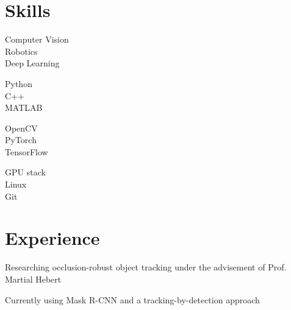\documentclass[]{deedy-resume-openfont}
\begin{document}
\begin{minipage}[t]{.6\textwidth}
\section{Skills}
\begin{minipage}[t]{.3\textwidth}
 \textbullet{}Computer Vision\\
 \textbullet{}Robotics\\
 \textbullet{}Deep Learning\\
 \hfill
\end{minipage}
\begin{minipage}[t]{.22\textwidth}
 \textbullet{}Python\\
 \textbullet{}C++\\
 \textbullet{}MATLAB\\
\end{minipage}
\begin{minipage}[t]{.22\textwidth}
\textbullet{}OpenCV\\
\textbullet{}PyTorch\\
\textbullet{}TensorFlow\\
\end{minipage}
\begin{minipage}[t]{.22\textwidth}
\textbullet{}GPU stack\\
\textbullet{}Linux\\
\textbullet{}Git\\
\end{minipage}
\sectionsep
\end{minipage}
\section{Experience}
\hfill
{}
\begin{tightemize}
\item Researching occlusion-robust object tracking under the advisement of Prof. Martial Hebert%
\item Currently using Mask R-CNN and a tracking-by-detection approach
\end{tightemize}
\end{document}
